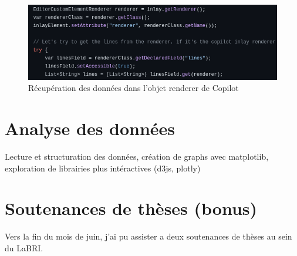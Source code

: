 \begin{figure}
	\centering
	\includegraphics[width=15cm]{images/getting-the-lines.png}
	\caption{Récupération des données dans l'objet renderer de Copilot}
	\label{getting-the-lines}
\end{figure}


\section{Analyse des données}

Lecture et structuration des données, création de graphs avec matplotlib, exploration de librairies plus intéractives (d3js, plotly)

\section{Soutenances de thèses (bonus)}

Vers la fin du mois de juin, j'ai pu assister a deux soutenances de thèses au sein du LaBRI.
